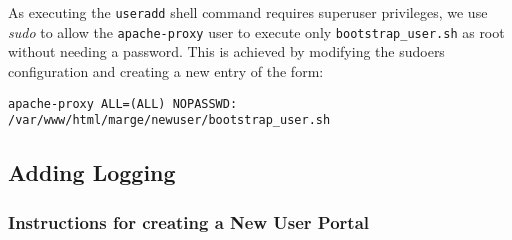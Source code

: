 As executing the \texttt{useradd} shell command requires superuser privileges,
we use \textit{sudo} to allow the \texttt{apache-proxy} user to execute only
\texttt{bootstrap\_user.sh} as root without needing a password. This is achieved
by modifying the sudoers configuration and creating a new entry of the form:

\begin{lstlisting}[frame=single]
    apache-proxy ALL=(ALL) NOPASSWD: /var/www/html/marge/newuser/bootstrap_user.sh
\end{lstlisting}


\subsection{Adding Logging}\label{section:logging}



\subsubsection*{Instructions for creating a New User Portal}

